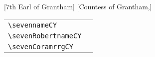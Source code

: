 [7th Earl of Grantham]
          [Countess of Grantham,\haschild]
\fbox{\usebox{\seven}}
%
\hfill\hskip0pt
\makeatletter
\let\nameuse=\@nameuse
\makeatother
\newcommand{\boxsz}[1]{%
  \texttt{\textbackslash#1} & \nameuse{#1}\\%
}
\newcommand{\tblA}{%
  \begin{tabular}{l|l}%
    \boxsz{sevennameCY}%
    \boxsz{sevenRobertnameCY}%
    \boxsz{sevenCoramrrgCY}%
  \end{tabular}%
}
\par
\bigskip
\hfill\tblA
